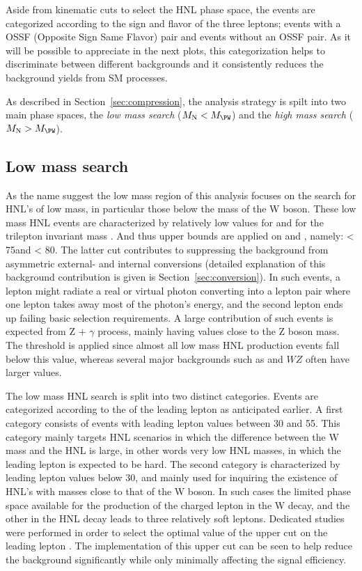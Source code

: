 Aside from kinematic cuts to select the HNL phase space, the events
are categorized according to the sign and flavor of the three
leptons; events with a OSSF (Opposite Sign Same Flavor) pair and
events without an OSSF pair. As it will be possible to appreciate in the
next plots, this categorization helps to discriminate between
different backgrounds and it consistently reduces the background yields
from SM processes.

As described in Section~\ref{sec:compression}, the analysis
strategy is spilt into two main phase spaces, the \emph{low mass search} ($M_\hnl <
M_\PW$) and the \emph{high mass search} ($M_\hnl > M_\PW$).

\subsection{Low mass search}

As the name suggest the low mass region of this analysis focuses on
the search for HNL's of low mass, in particular those below the mass
of the W boson. These low mass HNL events are characterized by
relatively low values for \ptmiss  and for the trilepton invariant mass
\mlll. And thus upper bounds are applied on \ptmiss  and \mlll , namely:
\ptmiss < 75\GeV and \mlll < 80\GeV. The latter cut contributes to 
suppressing the background from asymmetric external- and
internal conversions (detailed explanation of this background
contribution is given is Section~\ref{sec:conversion}). In such events, a lepton might radiate a real or
virtual photon converting into a lepton pair where one lepton takes
away most of the photon's energy, and the second lepton ends up
failing basic selection requirements. A large contribution of such
events is expected from Z + $\gamma$ process, mainly having \mlll
values close to the Z boson mass.
The \ptmiss threshold is applied since almost all low mass HNL production
events fall below this value, whereas several major backgrounds such
as \ttbar and $WZ$ often have larger \ptmiss  values.

The low mass HNL search is split into two distinct categories. Events
are categorized according to the \pt of the leading lepton as
anticipated earlier. A first category consists of events with leading
lepton \pt values between 30 and 55\GeV. This category mainly targets
HNL scenarios in which the difference between the W mass and the HNL
is large, in other words very low HNL masses, in which the leading
lepton is expected to be hard. The second category is characterized by
leading lepton \pt values below 30\GeV, and mainly used for inquiring
the existence of HNL's with masses close to that of the W boson. In
such cases the limited phase space available for the production of the
charged lepton in the W decay, and the other in the HNL decay leads to
three relatively soft leptons.
Dedicated studies were performed in order to select the optimal value
of the upper \pt cut on the leading lepton \pt.
The implementation of this upper \pt cut can be seen to help reduce the background significantly while only minimally affecting the signal efficiency.

